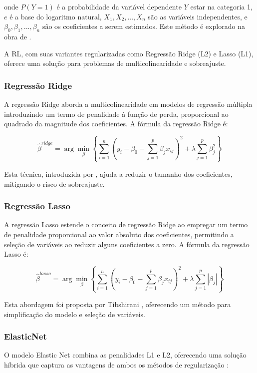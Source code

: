 onde \(P(Y=1)\) é a probabilidade da variável dependente \(Y\) estar na categoria 1, \(e\) é a base do logaritmo natural, \(X_1, X_2, ..., X_n\) são as variáveis independentes, e \(\beta_0, \beta_1, ..., \beta_n\) são os coeficientes a serem estimados. Este método é explorado na obra de \cite{hosmer2013applied}.

A RL, com suas variantes regularizadas como Regressão Ridge (L2) e Lasso (L1), oferece uma solução para problemas de multicolinearidade e sobreajuste.

\subsubsection{Regressão Ridge}

A regressão Ridge aborda a multicolinearidade em modelos de regressão múltipla introduzindo um termo de penalidade à função de perda, proporcional ao quadrado da magnitude dos coeficientes. A fórmula da regressão Ridge é:

\[ \hat{\beta}^{ridge} = \arg\min_\beta \left\{ \sum_{i=1}^{n} (y_i - \beta_0 - \sum_{j=1}^{p} \beta_jx_{ij})^2 + \lambda \sum_{j=1}^{p} \beta_j^2 \right\} \]

Esta técnica, introduzida por \cite{hoerl1970ridge}, ajuda a reduzir o tamanho dos coeficientes, mitigando o risco de sobreajuste.

\subsubsection{Regressão Lasso}

A regressão Lasso estende o conceito de regressão Ridge ao empregar um termo de penalidade proporcional ao valor absoluto dos coeficientes, permitindo a seleção de variáveis ao reduzir alguns coeficientes a zero. A fórmula da regressão Lasso é:

\[ \hat{\beta}^{lasso} = \arg\min_\beta \left\{ \sum_{i=1}^{n} (y_i - \beta_0 - \sum_{j=1}^{p} \beta_jx_{ij})^2 + \lambda \sum_{j=1}^{p} |\beta_j| \right\} \]

Esta abordagem foi proposta por Tibshirani \cite{tibshirani1996regression}, oferecendo um método para simplificação do modelo e seleção de variáveis.
\subsubsection{ElasticNet}

O modelo Elastic Net combina as penalidades L1 e L2, oferecendo uma solução híbrida que captura as vantagens de ambos os métodos de regularização \cite{hastie2009elements} :

